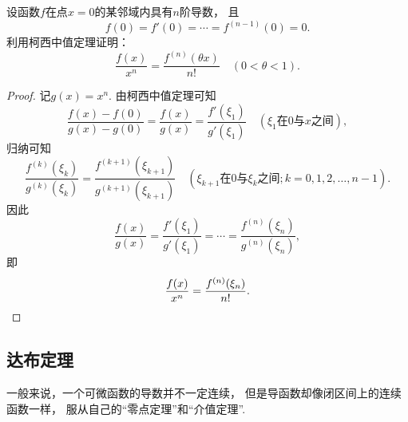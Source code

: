 \begin{example}
设函数\(f\)在点\(x=0\)的某邻域内具有\(n\)阶导数，
且\[
	f(0) = f'(0) = \dotsb = f^{(n-1)}(0) = 0.
\]
利用柯西中值定理证明：\[
	\frac{f(x)}{x^n} = \frac{f^{(n)}(\theta x)}{n!}
	\quad(0<\theta<1).
\]
\begin{proof}
记\(g(x) = x^n\).
由柯西中值定理可知\begin{equation*}
	\frac{f(x) - f(0)}{g(x) - g(0)}
	= \frac{f(x)}{g(x)}
	= \frac{f'(\xi_1)}{g'(\xi_1)}
	\quad(\text{$\xi_1$在$0$与$x$之间}),
\end{equation*}
归纳可知\begin{equation*}
	\frac{f^{(k)}(\xi_k)}{g^{(k)}(\xi_k)}
	= \frac{f^{(k+1)}(\xi_{k+1})}{g^{(k+1)}(\xi_{k+1})}
	\quad(\text{$\xi_{k+1}$在$0$与$\xi_k$之间};k=0,1,2,\dotsc,n-1).
\end{equation*}
因此\[
	\frac{f(x)}{g(x)}
	= \frac{f'(\xi_1)}{g'(\xi_1)}
	= \dotsb
	= \frac{f^{(n)}(\xi_n)}{g^{(n)}(\xi_n)},
\]
即\[
	\frac{f(x)}{x^n}
	= \frac{f^{(n)}(\xi_n)}{n!}.
	\qedhere
\]
\end{proof}
\end{example}

\subsection{达布定理}
一般来说，一个可微函数的导数并不一定连续，
但是导函数却像闭区间上的连续函数一样，
服从自己的“零点定理”和“介值定理”.


